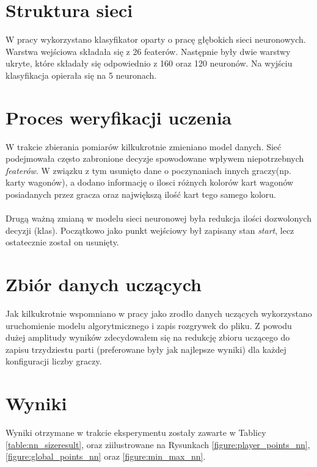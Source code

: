 \documentclass[12pt, oneside]{report}
\begin{document}
\section{Struktura sieci}
W pracy wykorzystano klasyfikator oparty o pracę głębokich sieci neuronowych. Warstwa wejściowa składała się z 26 featerów. Następnie były dwie warstwy ukryte, które składały się odpowiednio z 160 oraz 120 neuronów. Na wyjściu klasyfikacja opierała się na 5 neuronach.
\section{Proces weryfikacji uczenia}
W trakcie zbierania pomiarów kilkukrotnie zmieniano model danych. Sieć podejmowała często zabronione decyzje spowodowane wpływem niepotrzebnych \textit{featerów}. W związku z tym usunięto dane o poczynaniach innych graczy(np. karty wagonów), a dodano informację o ilosci różnych kolorów kart wagonów posiadanych przez gracza oraz największą ilość kart tego samego koloru. \\ \\ 
Drugą ważną zmianą w modelu sieci neuronowej była redukcja ilości dozwolonych decyzji (klas). Początkowo jako punkt wejściowy był zapisany stan \textit{start}, lecz ostatecznie został on usunięty.
\section{Zbiór danych uczących}
Jak kilkukrotnie wspomniano w pracy jako zrodło danych uczących wykorzystano uruchomienie modelu algorytmicznego i zapis rozgrywek do pliku. Z powodu dużej amplitudy wyników zdecydowałem się na redukcję zbioru uczącego do zapisu trzydziestu parti (preferowane były jak najlepsze wyniki) dla każdej konfiguracji liczby graczy. 
\section{Wyniki} 
Wyniki otrzymane w trakcie eksperymentu zostały zawarte w Tablicy \ref{table:nn_sizeresult}, oraz ziilustrowane na Rysunkach \ref{figure:player_points_nn}, \ref{figure:global_points_nn} oraz \ref{figure:min_max_nn}.
\end{document}
